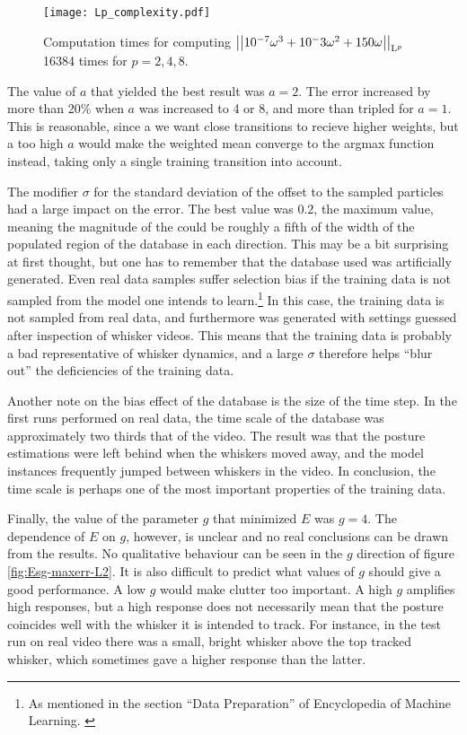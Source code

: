 \begin{figure}
  \centering
  \texttt{[image: Lp\_complexity.pdf]}
  \caption{Computation times for computing $\left\vert\left\vert10^{-7}\omega^3 +
      10^-3\omega^2 + 150\omega\right\vert\right\vert_{\mathrm{L}^{p}}$ 16384 times for $p=2,4,8$.}
  \label{fig:Lp-complexity}
\end{figure}

The value of $a$ that yielded the best result was $a=2$. The error
increased by more than 20\% when $a$ was increased to 4 or 8, and more
than tripled for $a=1$. This is reasonable, since a we want close
transitions to recieve higher weights, but a too high $a$ would make
the weighted mean converge to the argmax function instead, taking only
a single training transition into account.

The modifier $\sigma$ for the standard deviation of the offset to the
sampled particles had a large impact on the error. The best value was
$0.2$, the maximum value, meaning the magnitude of the could be
roughly a fifth of the width of the populated region of the database
in each direction. This may be a bit surprising at first thought, but
one has to remember that the database used was artificially
generated. Even real data samples suffer selection bias if the
training data is not sampled from the model one intends to
learn.\footnote{As mentioned in the section ``Data Preparation'' of
  Encyclopedia of Machine Learning. \cite{EncyclopediaMachineLearning}}
In this case, the training data is not sampled from real data, and
furthermore was generated with settings guessed after inspection of
whisker videos. This means that the training data is probably a bad
representative of whisker dynamics, and a large $\sigma$ therefore
helps ``blur out'' the deficiencies of the training data.

Another note on the bias effect of the database is the size of the
time step. In the first runs performed on real data, the time scale of
the database was approximately two thirds that of the video. The
result was that the posture estimations were left behind when the
whiskers moved away, and the model instances frequently jumped between
whiskers in the video. In conclusion, the time scale is perhaps one of
the most important properties of the training data.

Finally, the value of the parameter $g$ that minimized $E$ was
$g=4$. The dependence of $E$ on $g$, however, is unclear and no real
conclusions can be drawn from the results. No qualitative behaviour
can be seen in the $g$ direction of figure \ref{fig:Esg-maxerr-L2}. It
is also difficult to predict what values of $g$ should give a good
performance. A low $g$ would make clutter too important. A high $g$
amplifies high responses, but a high response does not necessarily
mean that the posture coincides well with the whisker it is intended
to track. For instance, in the test run on real video there was a
small, bright whisker above the top tracked whisker, which sometimes
gave a higher response than the latter.




